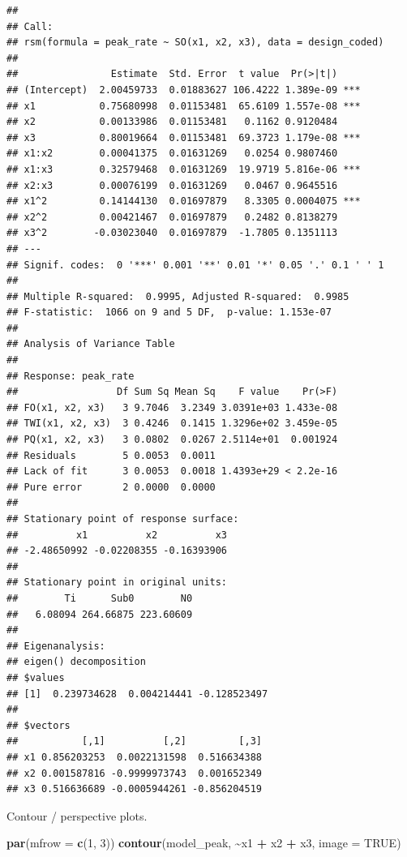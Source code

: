 \documentclass[
]{article}
\newenvironment{Shaded}{\begin{snugshade}}{\end{snugshade}}
\newcommand{\AttributeTok}[1]{\textcolor[rgb]{0.13,0.29,0.53}{#1}}
\newcommand{\ConstantTok}[1]{\textcolor[rgb]{0.56,0.35,0.01}{#1}}
\newcommand{\DecValTok}[1]{\textcolor[rgb]{0.00,0.00,0.81}{#1}}
\newcommand{\FunctionTok}[1]{\textcolor[rgb]{0.13,0.29,0.53}{\textbf{#1}}}
\newcommand{\NormalTok}[1]{#1}
\newcommand{\SpecialCharTok}[1]{\textcolor[rgb]{0.81,0.36,0.00}{\textbf{#1}}}
\begin{document}
\begin{verbatim}
## 
## Call:
## rsm(formula = peak_rate ~ SO(x1, x2, x3), data = design_coded)
## 
##                Estimate  Std. Error  t value  Pr(>|t|)    
## (Intercept)  2.00459733  0.01883627 106.4222 1.389e-09 ***
## x1           0.75680998  0.01153481  65.6109 1.557e-08 ***
## x2           0.00133986  0.01153481   0.1162 0.9120484    
## x3           0.80019664  0.01153481  69.3723 1.179e-08 ***
## x1:x2        0.00041375  0.01631269   0.0254 0.9807460    
## x1:x3        0.32579468  0.01631269  19.9719 5.816e-06 ***
## x2:x3        0.00076199  0.01631269   0.0467 0.9645516    
## x1^2         0.14144130  0.01697879   8.3305 0.0004075 ***
## x2^2         0.00421467  0.01697879   0.2482 0.8138279    
## x3^2        -0.03023040  0.01697879  -1.7805 0.1351113    
## ---
## Signif. codes:  0 '***' 0.001 '**' 0.01 '*' 0.05 '.' 0.1 ' ' 1
## 
## Multiple R-squared:  0.9995, Adjusted R-squared:  0.9985 
## F-statistic:  1066 on 9 and 5 DF,  p-value: 1.153e-07
## 
## Analysis of Variance Table
## 
## Response: peak_rate
##                 Df Sum Sq Mean Sq    F value    Pr(>F)
## FO(x1, x2, x3)   3 9.7046  3.2349 3.0391e+03 1.433e-08
## TWI(x1, x2, x3)  3 0.4246  0.1415 1.3296e+02 3.459e-05
## PQ(x1, x2, x3)   3 0.0802  0.0267 2.5114e+01  0.001924
## Residuals        5 0.0053  0.0011                     
## Lack of fit      3 0.0053  0.0018 1.4393e+29 < 2.2e-16
## Pure error       2 0.0000  0.0000                     
## 
## Stationary point of response surface:
##          x1          x2          x3 
## -2.48650992 -0.02208355 -0.16393906 
## 
## Stationary point in original units:
##        Ti      Sub0        N0 
##   6.08094 264.66875 223.60609 
## 
## Eigenanalysis:
## eigen() decomposition
## $values
## [1]  0.239734628  0.004214441 -0.128523497
## 
## $vectors
##           [,1]          [,2]         [,3]
## x1 0.856203253  0.0022131598  0.516634388
## x2 0.001587816 -0.9999973743  0.001652349
## x3 0.516636689 -0.0005944261 -0.856204519
\end{verbatim}

Contour / perspective plots.

\begin{Shaded}
\begin{Highlighting}[]
\FunctionTok{par}\NormalTok{(}\AttributeTok{mfrow =} \FunctionTok{c}\NormalTok{(}\DecValTok{1}\NormalTok{, }\DecValTok{3}\NormalTok{))}
\FunctionTok{contour}\NormalTok{(model\_peak, }\SpecialCharTok{\textasciitilde{}}\NormalTok{x1 }\SpecialCharTok{+}\NormalTok{ x2 }\SpecialCharTok{+}\NormalTok{ x3, }\AttributeTok{image =} \ConstantTok{TRUE}\NormalTok{)}
\end{Highlighting}
\end{Shaded}
\end{document}
